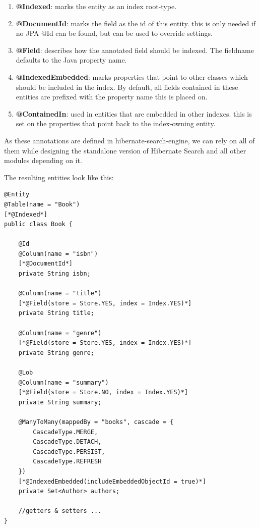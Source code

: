 \begin{enumerate}
	\item \textbf{@Indexed}: marks the entity as an index root-type.
	\item \textbf{@DocumentId}: marks the field as the id of this entity. this is only needed if no JPA @Id can be found, but can be used to override settings.
	\item \textbf{@Field}: describes how the annotated field should be indexed. The fieldname defaults to the Java property name.
	\item \textbf{@IndexedEmbedded}: marks properties that point to other classes which should be included in the index. By default, all fields contained in these entities are prefixed with the property name this is placed on.
	\item \textbf{@ContainedIn}: used in entities that are embedded in other indexes. this is set on the properties that point back to the index-owning entity.
\end{enumerate}
\noindent
As these annotations are defined in hibernate-search-engine, we can rely on all of them while designing the standalone version of Hibernate Search and all other modules depending on it.

\pagebreak
\noindent
The resulting entities look like this:
\\
\lstset{language=java}
\begin{lstlisting}[frame=htrbl, caption={Book.java with Hibernate Search annotations}, label={lst:book.java_2}]
@Entity
@Table(name = "Book")
[*@Indexed*]
public class Book {

	@Id
	@Column(name = "isbn")
	[*@DocumentId*]
	private String isbn;
	
	@Column(name = "title")
	[*@Field(store = Store.YES, index = Index.YES)*]
	private String title;
	
	@Column(name = "genre")
	[*@Field(store = Store.YES, index = Index.YES)*]
	private String genre;
	
	@Lob
	@Column(name = "summary")
	[*@Field(store = Store.NO, index = Index.YES)*]
	private String summary;
	
	@ManyToMany(mappedBy = "books", cascade = {
		CascadeType.MERGE,
		CascadeType.DETACH,
		CascadeType.PERSIST,
		CascadeType.REFRESH
	})
	[*@IndexedEmbedded(includeEmbeddedObjectId = true)*]
	private Set<Author> authors;
	
	//getters & setters ...
}
\end{lstlisting}

